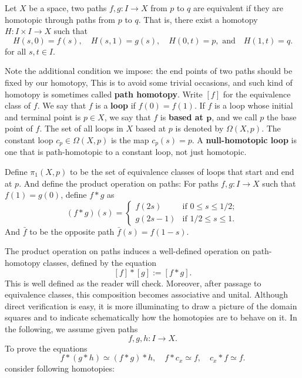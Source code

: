 \begin{definition}
Let $X$ be a space, two paths $f,g:I\to X$ from $p$ to $q$ are equivalent if they are homotopic through paths from $p$ to $q$. That is, there exist a homotopy $H:I\times I\to X$ such that
\[H(s,0)=f(s),\quad H(s,1)=g(s),\quad H(0,t)=p,\text{ and}\quad H(1,t)=q.\]
for all $s,t\in I$.
\end{definition}

Note the additional condition we impose: the end points of two paths should be fixed by our homotopy, This is to avoid some trivial occasions, and such kind of homotopy is sometimes called \textbf{path homotopy}. Write $[f]$ for the equivalence class of $f$. We say that $f$ is a \textbf{loop} if $f(0)=f(1)$. If $f$ is a loop whose initial and terminal point is $p\in X$, we say that $f$ is \textbf{based at $\bm{p}$}, and we call $p$ the base point of $f$. The set of all loops in $X$ based at $p$ is denoted by $\Omega(X,p)$. The constant loop $c_p\in\Omega(X,p)$ is the map $c_p(s)=p$. A \textbf{null-homotopic loop} is one that is path-homotopic to a constant loop, not just homotopic.\par 
Define $\pi_1(X,p)$ to be the set of equivalence classes of loops that start and end at $p$. And define the product operation on paths: For paths $f,g:I\to X$ such that $f(1)=g(0)$, define $f\ast g$ as
\[(f\ast g)(s)=\begin{cases}
f(2s)&\text{if }0\leq s\leq 1/2;\\
g(2s-1)&\text{if }1/2\leq s\leq 1.
\end{cases}\]
And $\bar{f}$ to be the opposite path $\bar{f}(s)=f(1-s)$.\par 
The product operation on paths induces a well-defined operation on path-homotopy classes, defined by the equation
\[[f]\ast[g]:=[f\ast g].\]
This is well defined as the reader will check. Moreover, after passage to equivalence classes, this composition becomes associative and unital. Although direct verification is easy, it is more illuminating to draw a picture of the domain squares and to indicate schematically how the homotopies are to behave on it. In the following, we assume given paths
\[f,g,h:I\to X.\]
To prove the equations
\[f\ast(g\ast h)\simeq (f\ast g)\ast h,\quad f\ast c_x\simeq f,\quad c_x\ast f\simeq f.\]
consider following homotopies:
